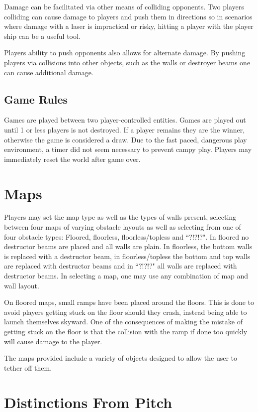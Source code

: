 \documentclass[10pt,a4paper]{article}
\begin{document}
Damage can be facilitated via other means of colliding opponents. Two players colliding can cause damage to players and push them in directions so in scenarios where damage with a laser is impractical or risky, hitting a player with the player ship can be a useful tool.

Players ability to push opponents also allows for alternate damage. By pushing players via collisions into other objects, such as the walls or destroyer beams one can cause additional damage.

\subsection{Game Rules}

Games are played between two player-controlled entities. Games are played out until 1 or less players is not destroyed. If a player remains they are the winner, otherwise the game is considered a draw. Due to the fast paced, dangerous play environment, a timer did not seem necessary to prevent campy play. Players may immediately reset the world after game over.

\section{Maps}

Players may set the map type as well as the types of walls present, selecting between four maps of varying obstacle layouts as well as selecting from one of four obstacle types: Floored, floorless, floorless/topless and ``?!?!?". In floored no destructor beams are placed and all walls are plain. In floorless, the bottom walls is replaced with a destructor beam, in floorless/topless the bottom and top walls are replaced with destructor beams and in ``?!?!?" all walls are replaced with destructor beams. In selecting a map, one may use any combination of map and wall layout.

On floored maps, small ramps have been placed around the floors. This is done to avoid players getting stuck on the floor should they crash, instead being able to launch themselves skyward. One of the consequences of making the mistake of getting stuck on the floor is that the collision with the ramp if done too quickly will cause damage to the player.

The maps provided include a variety of objects designed to allow the user to tether off them.

\section{Distinctions From Pitch}
\end{document}
